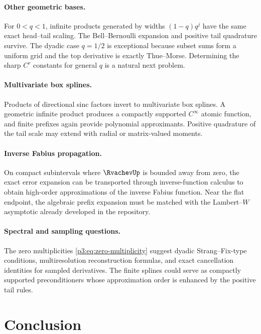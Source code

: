 \documentclass[11pt,oneside]{article}
\numberwithin{equation}{section}
\theoremstyle{definition}
\theoremstyle{remark}
\begin{document}
\paragraph{Other geometric bases.}
For $0<q<1$, infinite products generated by widths $(1-q)q^j$ have the same exact
head--tail scaling.  The Bell--Bernoulli expansion and positive tail quadrature survive.
The dyadic case $q=1/2$ is exceptional because subset sums form a uniform grid and the
top derivative is exactly Thue--Morse.  Determining the sharp $C^r$ constants for
general $q$ is a natural next problem.

\paragraph{Multivariate box splines.}
Products of directional sinc factors invert to multivariate box splines.  A geometric
infinite product produces a compactly supported $C^\infty$ atomic function, and finite
prefixes again provide polynomial approximants.  Positive quadrature of the tail scale
may extend with radial or matrix-valued moments.

\paragraph{Inverse Fabius propagation.}
On compact subintervals where $\RvachevUp$ is bounded away from zero, the exact error expansion
can be transported through inverse-function calculus to obtain high-order approximations
of the inverse Fabius function.  Near the flat endpoint, the algebraic prefix expansion
must be matched with the Lambert--$W$ asymptotic already developed in the repository.

\paragraph{Spectral and sampling questions.}
The zero multiplicities \cref{p3:eq:zero-multiplicity} suggest dyadic Strang--Fix-type
conditions, multiresolution reconstruction formulas, and exact cancellation identities
for sampled derivatives.  The finite splines could serve as compactly supported
preconditioners whose approximation order is enhanced by the positive tail rules.

\section{Conclusion}
\end{document}
